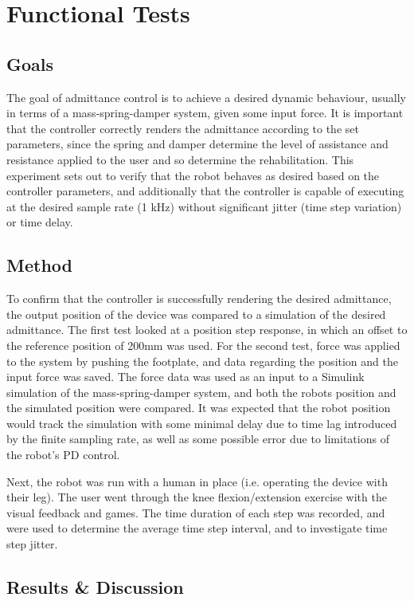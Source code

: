 \documentclass[12pt]{report}
\begin{document}
	\section{Functional Tests}

	\subsection{Goals}
	
	The goal of admittance control is to achieve a desired dynamic behaviour, usually in terms of a mass-spring-damper system, given some input force. It is important that the controller correctly renders the admittance according to the set parameters, since the spring and damper determine the level of assistance and resistance applied to the user and so determine the rehabilitation. This experiment sets out to verify that the robot behaves as desired based on the controller parameters, and additionally that the controller is capable of executing at the desired sample rate (1 kHz) without significant jitter (time step variation) or time delay. 
	
	\subsection{Method}

	To confirm that the controller is successfully rendering the desired admittance, the output position of the device was compared to a simulation of the desired admittance. The first test looked at a position step response, in which an offset to the reference position of 200mm was used. For the second test, force was applied to the system by pushing the footplate, and data regarding the position and the input force was saved. The force data was used as an input to a Simulink simulation of the mass-spring-damper system, and both the robots position and the simulated position were compared. It was expected that the robot position would track the simulation with some minimal delay due to time lag introduced by the finite sampling rate, as well as some possible error due to limitations of the robot's PD control.	
	
	Next, the robot was run with a human in place (i.e. operating the device with their leg). The user went through the knee flexion/extension exercise with the visual feedback and games. The time duration of each step was recorded, and were used to determine the average time step interval, and to investigate time step jitter.  
	
	\subsection{Results \& Discussion}
	
\end{document}
